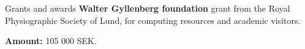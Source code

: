 \begin{rubric}{Grants and awards}
\entry*[November 2020]%
\textbf{Walter Gyllenberg foundation} grant from the Royal Physiographic Society of Lund, for computing resources and academic visitors. \par
\textbf{Amount:} 105 000 SEK. 
%
%
\end{rubric}
